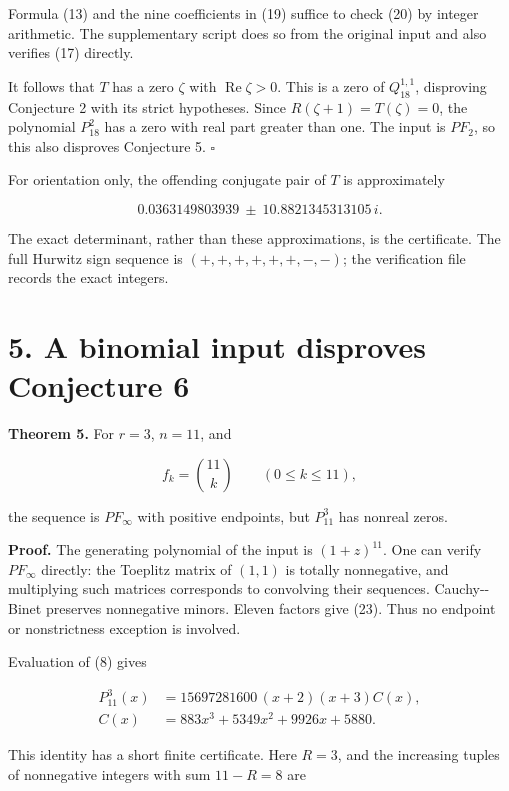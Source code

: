 \documentclass[11pt]{article}
\begin{document}
Formula (13) and the nine coefficients in (19) suffice to check (20) by
integer arithmetic. The supplementary script does so from the original
input and also verifies (17) directly.

It follows that \(T\) has a zero \(\zeta\) with
\(\operatorname{Re}\zeta>0\). This is a zero of \(Q_{18}^{1,1}\),
disproving Conjecture 2 with its strict hypotheses. Since
\(R(\zeta+1)=T(\zeta)=0\), the polynomial \(P_{18}^2\) has a zero with
real part greater than one. The input is \(PF_2\), so this also
disproves Conjecture 5. \(\square\)

For orientation only, the offending conjugate pair of \(T\) is
approximately

\[
0.0363149803939\ \mathbin{\pm}\ 10.8821345313105\,i.
\tag{22}
\]

The exact determinant, rather than these approximations, is the
certificate. The full Hurwitz sign sequence is \((+,+,+,+,+,+,-,-)\);
the verification file records the exact integers.

\section{5. A binomial input disproves Conjecture
6}\label{a-binomial-input-disproves-conjecture-6}

\textbf{Theorem 5.} For \(r=3\), \(n=11\), and

\[
f_k=\binom{11}{k}\qquad(0\le k\le11),
\tag{23}
\]

the sequence is \(PF_\infty\) with positive endpoints, but \(P_{11}^3\)
has nonreal zeros.

\textbf{Proof.} The generating polynomial of the input is
\((1+z)^{11}\). One can verify \(PF_\infty\) directly: the Toeplitz
matrix of \((1,1)\) is totally nonnegative, and multiplying such
matrices corresponds to convolving their sequences. Cauchy-\/-Binet
preserves nonnegative minors. Eleven factors give (23). Thus no endpoint
or nonstrictness exception is involved.

Evaluation of (8) gives

\[
\begin{aligned}
P_{11}^3(x)&=15697281600\,(x+2)(x+3)C(x),\\
C(x)&=883x^3+5349x^2+9926x+5880.
\end{aligned}
\tag{24}
\]

This identity has a short finite certificate. Here \(R=3\), and the
increasing tuples of nonnegative integers with sum \(11-R=8\) are
\end{document}
